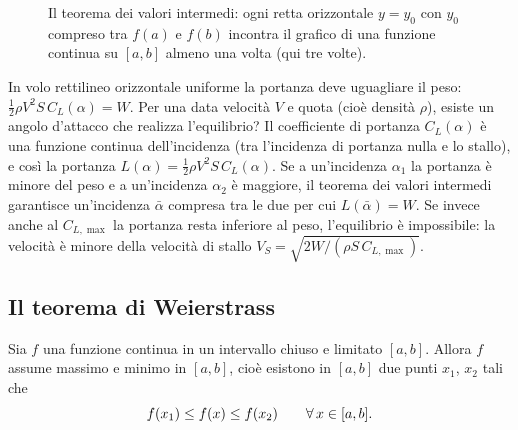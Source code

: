 \begin{figure}[htb]
\centering
{}
\caption{Il teorema dei valori intermedi: ogni retta orizzontale $y=y_{0}$ con $y_{0}$
compreso tra $f(a)$ e $f(b)$ incontra il grafico di una funzione continua su $[a,b]$
almeno una volta (qui tre volte).}
\label{fig:valori-intermedi}
\end{figure}

\begin{idea}
In volo rettilineo orizzontale uniforme la portanza deve uguagliare il peso:
$\frac12\rho V^{2}S\,C_{L}(\alpha)=W$. Per una data velocità $V$ e quota (cioè densità
$\rho$), esiste un angolo d'attacco che realizza l'equilibrio? Il coefficiente di
portanza $C_{L}(\alpha)$ è una funzione continua dell'incidenza (tra l'incidenza di
portanza nulla e lo stallo), e così la portanza $L(\alpha)=\frac12\rho V^{2}S\,C_{L}(\alpha)$.
Se a un'incidenza $\alpha_{1}$ la portanza è minore del peso e a un'incidenza $\alpha_{2}$
è maggiore, il teorema dei valori intermedi garantisce un'incidenza $\bar\alpha$ compresa
tra le due per cui $L(\bar\alpha)=W$. Se invece anche al $C_{L,\max}$ la portanza resta
inferiore al peso, l'equilibrio è impossibile: la velocità è minore della velocità di
stallo $V_{S}=\sqrt{2W/(\rho S\,C_{L,\max})}$.
\end{idea}

\subsection{Il teorema di Weierstrass}

\begin{teorema}[di Weierstrass]\label{teo:weierstrass}
Sia $f$ una funzione continua in un intervallo chiuso e limitato $[a,b]$. Allora $f$
assume massimo e minimo in $[a,b]$, cioè esistono in $[a,b]$ due punti $x_{1}$, $x_{2}$
tali che
\begin{equation}\label{eq:weierstrass}
  f(x_{1})\le f(x)\le f(x_{2}) \qquad\forall\, x\in[a,b].
\end{equation}
\end{teorema}

